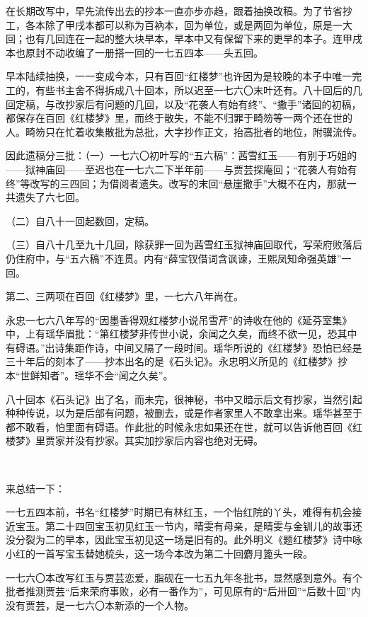 \par 在长期改写中，早先流传出去的抄本一直亦步亦趋，跟着抽换改稿。为了节省抄工，各本除了甲戌本都可以称为百衲本，回为单位，或是两回为单位，原是一大回；也有几回连在一起的整大块早本，早本中又有保留下来的更早的本子。连甲戌本也原封不动收编了一册搭一回的一七五四本——头五回。
\par 早本陆续抽换，一一变成今本，只有百回“红楼梦”也许因为是较晚的本子中唯一完工的，有些书主舍不得拆成八十回本，所以迟至一七六〇末叶还有。八十回后的几回定稿，与改抄家后有问题的几回，以及“花袭人有始有终”、“撒手”诸回的初稿，都保存在百回《红楼梦》里，而终于散失，不能不归罪于畸笏等一两个还在世的人。畸笏只在忙着收集散批为总批，大字抄作正文，抬高批者的地位，附骥流传。
\par 因此遗稿分三批：（一）一七六〇初叶写的“五六稿”：茜雪红玉——有别于巧姐的——狱神庙回——至迟也在一七六二下半年前——与贾芸探庵回；“花袭人有始有终”等改写的三四回；为借阅者遗失。改写的末回“悬崖撒手”大概不在内，那就一共遗失了六七回。
\par （二）自八十一回起数回，定稿。
\par （三）自八十几至九十几回，除获罪一回为茜雪红玉狱神庙回取代，写荣府败落后仍住府中，与“五六稿”不连贯。内有“薛宝钗借词含讽谏，王熙凤知命强英雄”一回。
\par 第二、三两项在百回《红楼梦》里，一七六八年尚在。
\par 永忠一七六八年写的“因墨香得观红楼梦小说吊雪芹”的诗收在他的《延芬室集》中，上有瑶华眉批：“第红楼梦非传世小说，余闻之久矣，而终不欲一见，恐其中有碍语。”出诗集距作诗，中间又隔了一段时间。瑶华所说的《红楼梦》恐怕已经是三十年后的刻本了——抄本出名的是《石头记》。永忠明义所见的《红楼梦》抄本“世鲜知者”。瑶华不会“闻之久矣”。
\par 八十回本《石头记》出了名，而未完，很神秘，书中又暗示后文有抄家，当然引起种种传说，以为是后部有问题，被删去，或是作者家里人不敢拿出来。瑶华甚至于都不敢看，怕里面有碍语。作此批的时候永忠如果还在世，就可以告诉他百回《红楼梦》里贾家并没有抄家。其实加抄家后内容也绝对无碍。
\par  
\par 来总结一下：
\par 一七五四本前，书名“红楼梦”时期已有林红玉，一个怡红院的丫头，难得有机会接近宝玉。第二十四回宝玉初见红玉一节内，晴雯有母亲，是晴雯与金钏儿的故事还没分裂为二的早本，因此宝玉初见这一场是旧有的。此外明义《题红楼梦》诗中咏小红的一首写宝玉替她梳头，这一场今本改为第二十回麝月篦头一段。
\par 一七六〇本改写红玉与贾芸恋爱，脂砚在一七五九年冬批书，显然感到意外。有个批者推测贾芸“后来荣府事败，必有一番作为”，可见原有的“后卅回”“后数十回”内没有贾芸，是一七六〇本新添的一个人物。
